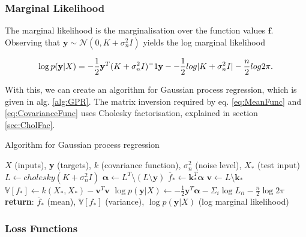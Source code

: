 \documentclass[12pt,a4paper]{report}
\theoremstyle{definition}
\begin{document}
\subsubsection{Marginal Likelihood}

The marginal likelihood is the marginalisation over the function values $\textbf{f}$. 
Observing that $\textbf{y} \sim \mathcal{N} (0, K + \sigma_{n}^2I)$ yields the log marginal likelihood

\begin{equation}
	\label{eq:LogMargLik}
	\centering
	\log p(\textbf{y} | X) = -\frac{1}{2}\textbf{y}^T(K +  \sigma_{n}^2I)^-1\textbf{y} - -\frac{1}{2}log|K +  \sigma_{n}^2I| - \frac{n}{2}log2\pi.
\end{equation}

With this, we can create an algorithm for Gaussian process regression, which is given in alg. \ref{alg:GPR}. The matrix inversion required by eq. \ref{eq:MeanFunc} and \ref{eq:CovarianceFunc} uses Cholesky factorisation, explained in section \ref{sec:CholFac}. 

\begin{algorithm}
	\caption{Algorithm for Gaussian process regression \citep{RasmussenWilliams2006}}
	\label{alg:GPR}
	\begin{algorithmic}[1]
		\Require $X$ (inputs), \textbf{y} (targets), $k$ (covariance function), $\sigma_{n}^2$ (noise level), $X_{*}$ (test input)	
		\State $L \gets cholesky(K +\sigma_{n}^2I)$
		\State $\boldsymbol{\alpha} \gets L^T \setminus (L \setminus \textbf{y})$ 
		\State $\overline{f}_{*} \gets \textbf{k}_{*}^T \boldsymbol{\alpha}$ 
		\State $\textbf{v} \gets L \setminus \textbf{k}_{*}$ 
		\State $\mathbb{V}[f_{*}] \gets k(X_{*}, X_{*}) - \textbf{v}^T\textbf{v}$ 
		\State $\log p(\textbf{y} | X) \gets -\frac{1}{2} \textbf{y}^T \boldsymbol{\alpha} - \Sigma_{i} \log L_{ii} - \frac{n}{2} \log2\pi$ 
		\State \textbf{return}: $\overline{f}_{*}$ (mean), $\mathbb{V}[f_{*}]$ (variance), $\log p(\textbf{y} | X)$ (log marginal likelihood)
	\end{algorithmic}
\end{algorithm}

\subsubsection{Loss Functions}
\end{document}
